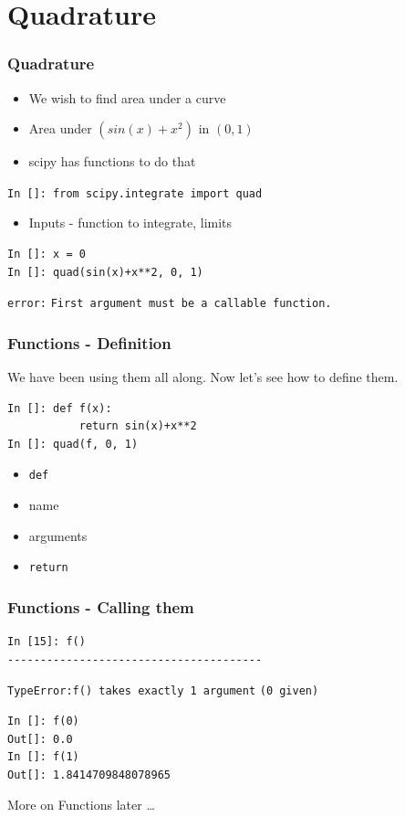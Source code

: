 \documentclass[14pt,compress]{beamer}
\newcommand{\typ}[1]{\lstinline{#1}}
\begin{document}
\section{Quadrature}

\begin{frame}[fragile]
\frametitle{Quadrature}
\begin{itemize}
\item We wish to find area under a curve
\item Area under $(sin(x) + x^2)$ in $(0,1)$
\item scipy has functions to do that
\end{itemize}
\begin{small}
  \typ{In []: from scipy.integrate import quad}
\end{small}
\begin{itemize}
\item Inputs - function to integrate, limits
\end{itemize}
\begin{lstlisting}
In []: x = 0
In []: quad(sin(x)+x**2, 0, 1)
\end{lstlisting}
\begin{small}
\alert{\typ{error:}}
\typ{First argument must be a callable function.}
\end{small}
\end{frame}

\begin{frame}[fragile]
\frametitle{Functions - Definition}
We have been using them all along. Now let's see how to define them.
\begin{lstlisting}
In []: def f(x):
           return sin(x)+x**2
In []: quad(f, 0, 1)
\end{lstlisting}
\begin{itemize}
\item \typ{def}
\item name
\item arguments
\item \typ{return}
\end{itemize}
\end{frame}

\begin{frame}[fragile]
\frametitle{Functions - Calling them}
\begin{lstlisting}
In [15]: f()
---------------------------------------
\end{lstlisting}
\alert{\typ{TypeError:}}\typ{f() takes exactly 1 argument}
\typ{(0 given)}
\begin{lstlisting}
In []: f(0)
Out[]: 0.0
In []: f(1)
Out[]: 1.8414709848078965
\end{lstlisting}
More on Functions later \ldots
\end{frame}
\end{document}
